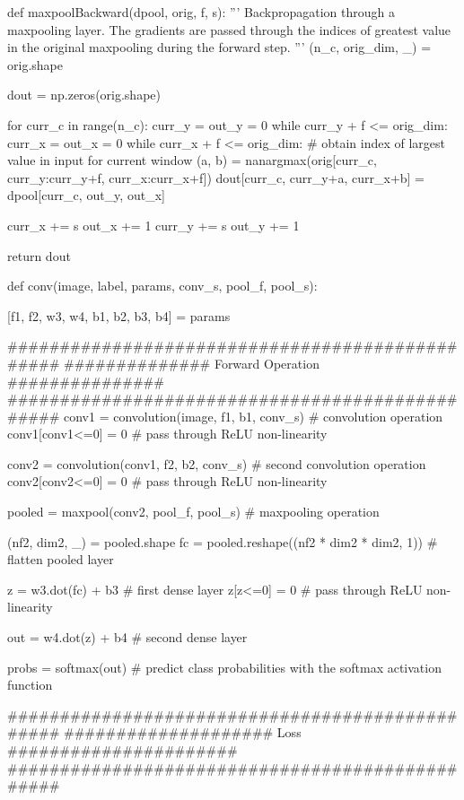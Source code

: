 \starttyping
def maxpoolBackward(dpool, orig, f, s):
    '''
    Backpropagation through a maxpooling layer. The gradients are passed through the indices of greatest value in the original maxpooling during the forward step.
    '''
    (n_c, orig_dim, _) = orig.shape
    
    dout = np.zeros(orig.shape)
    
    for curr_c in range(n_c):
        curr_y = out_y = 0
        while curr_y + f <= orig_dim:
            curr_x = out_x = 0
            while curr_x + f <= orig_dim:
                # obtain index of largest value in input for current window
                (a, b) = nanargmax(orig[curr_c, curr_y:curr_y+f, curr_x:curr_x+f])
                dout[curr_c, curr_y+a, curr_x+b] = dpool[curr_c, out_y, out_x]
                
                curr_x += s
                out_x += 1
            curr_y += s
            out_y += 1
        
    return dout
\stoptyping

\starttyping
def conv(image, label, params, conv_s, pool_f, pool_s):
    
    [f1, f2, w3, w4, b1, b2, b3, b4] = params 
    
    ################################################
    ############## Forward Operation ###############
    ################################################
    conv1 = convolution(image, f1, b1, conv_s) # convolution operation
    conv1[conv1<=0] = 0 # pass through ReLU non-linearity
    
    conv2 = convolution(conv1, f2, b2, conv_s) # second convolution operation
    conv2[conv2<=0] = 0 # pass through ReLU non-linearity
    
    pooled = maxpool(conv2, pool_f, pool_s) # maxpooling operation
    
    (nf2, dim2, _) = pooled.shape
    fc = pooled.reshape((nf2 * dim2 * dim2, 1)) # flatten pooled layer
    
    z = w3.dot(fc) + b3 # first dense layer
    z[z<=0] = 0 # pass through ReLU non-linearity
    
    out = w4.dot(z) + b4 # second dense layer
     
    probs = softmax(out) # predict class probabilities with the softmax activation function
    
    ################################################
    #################### Loss ######################
    ################################################
    
